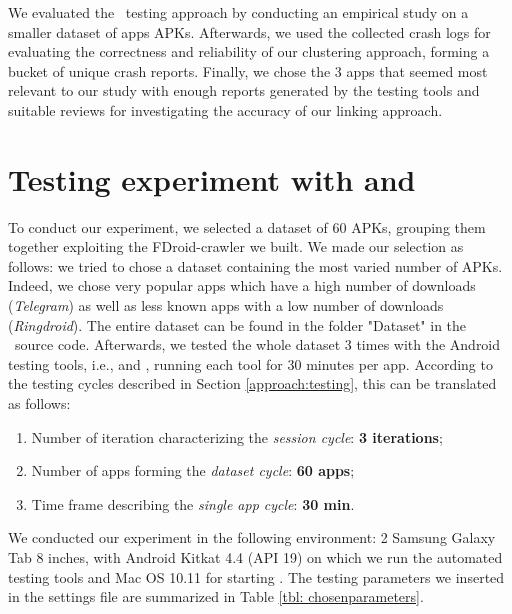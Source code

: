 \label{chapter:results}
We evaluated the \toolname\ testing approach by conducting an empirical study on a smaller dataset of apps  APKs.
Afterwards, we used the collected crash logs for evaluating the correctness and reliability of our clustering approach, forming a bucket of unique crash reports. 
Finally, we chose the 3 apps that seemed most relevant to our study with enough reports generated by the testing tools and suitable reviews for investigating the accuracy of our linking approach. 

\section{Testing experiment with \monkey and \sapienz}
To conduct our experiment, we selected a dataset of 60 APKs, grouping them together exploiting the FDroid-crawler we built. 
We made our selection as follows: we tried to chose a dataset containing the most varied number of APKs. Indeed, we chose very popular apps which have a high number of downloads (\eg \textit{Telegram}) as well as less known apps with a low number of downloads (\eg \textit{Ringdroid}). 
The entire dataset can be found in the folder "Dataset" in the \toolname\ source code.  
Afterwards, we tested the whole dataset 3 times with the Android testing tools, i.e., \monkey and \sapienz, running each tool for 30 minutes per app.
According to the testing cycles described in Section \ref{approach:testing}, this can be translated as follows: 
\begin{enumerate}
\item Number of iteration characterizing the \textit{session cycle}: \textbf{3 iterations}; 
\item Number of apps forming the \textit{dataset cycle}: \textbf{60 apps}; 
\item Time frame describing the \textit{single app cycle}: \textbf{30 min}.
\end{enumerate}
We conducted our experiment in the following environment: 2 Samsung Galaxy Tab 8 inches, with Android Kitkat 4.4 (API 19) on which we run the automated testing tools and Mac OS 10.11 for starting \toolname.
The testing parameters we inserted in the settings file are summarized in Table \ref{tbl: chosenparameters}. 
